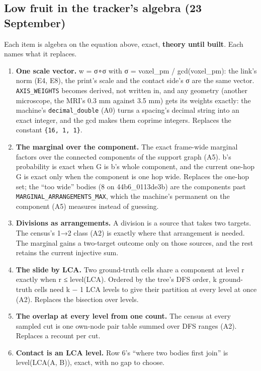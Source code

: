 \subsection{\texorpdfstring{Low fruit in the tracker's algebra (23 September)}{Low fruit in the tracker's algebra (23 September)}}

Each item is algebra on the equation above, exact, \textbf{theory until built}. Each names what it replaces.

\begin{enumerate}
\item \textbf{One scale vector.} w = σ∘σ with σ = voxel\_\allowbreak{}pm / gcd(voxel\_\allowbreak{}pm): the link's norm (E4, E8), the print's scale and the contact side's σ are the same vector. \texttt{AXIS\_\allowbreak{}WEIGHTS} becomes derived, not written in, and any geometry (another microscope, the MRI's 0.3 mm against 3.5 mm) gets its weights exactly: the machine's \texttt{decimal\_\allowbreak{}double} (A0) turns a spacing's decimal string into an exact integer, and the gcd makes them coprime integers. Replaces the constant \texttt{\{16, 1, 1\}}.
\item \textbf{The marginal over the component.} The exact frame-wide marginal factors over the connected components of the support graph (A5). b's probability is exact when G is b's whole component, and the current one-hop G is exact only when the component is one hop wide. Replaces the one-hop set; the “too wide” bodies (8 on 44b6\_\allowbreak{}0113de3b) are the components past \texttt{MARGINAL\_\allowbreak{}ARRANGEMENTS\_\allowbreak{}MAX}, which the machine's permanent on the component (A5) measures instead of guessing.
\item \textbf{Divisions as arrangements.} A division is a source that takes two targets. The census's 1→2 class (A2) is exactly where that arrangement is needed. The marginal gains a two-target outcome only on those sources, and the rest retains the current injective sum.
\item \textbf{The slide by LCA.} Two ground-truth cells share a component at level r exactly when r ≤ level(LCA). Ordered by the tree's DFS order, k ground-truth cells need k − 1 LCA levels to give their partition at every level at once (A2). Replaces the bisection over levels.
\item \textbf{The overlap at every level from one count.} The census at every sampled cut is one own-node pair table summed over DFS ranges (A2). Replaces a recount per cut.
\item \textbf{Contact is an LCA level.} Row 6's “where two bodies first join” is level(LCA(A, B)), exact, with no gap to choose.
\end{enumerate}

